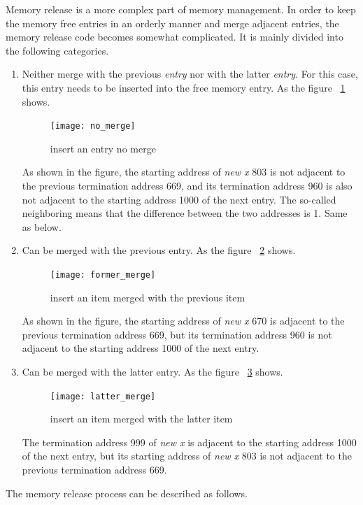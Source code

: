 \documentclass{swfcthesis}
\begin{document}
Memory release is a more complex part of memory management. In order to keep the memory
free entries in an orderly manner and merge adjacent entries, the memory release code
becomes somewhat complicated. It is mainly divided into the following categories.
\begin{enumerate}
\item Neither merge with the previous \emph{entry} nor with the latter \emph{entry}. For
  this case, this entry needs to be inserted into the free memory entry. As the figure
  ~\ref{fig:no-merge} shows.
  \begin{figure}[!ht]
    \centering
    \texttt{[image: no\_merge]}
    \caption{insert an entry no merge}
    \label{fig:no-merge}
  \end{figure}
  As shown in the figure, the starting address of \emph{new x} 803 is not adjacent to
  the previous termination address 669, and its termination address 960 is also not
  adjacent to the starting address 1000 of the next entry. The so-called neighboring means
  that the difference between the two addresses is 1. Same as below.

\item Can be merged with the previous entry. As the figure ~\ref{fig:former-merge} shows.
  \begin{figure}[!ht]
    \centering
    \texttt{[image: former\_merge]}
    \caption{insert an item merged with the previous item}
    \label{fig:former-merge}
  \end{figure}
  As shown in the figure, the starting address of \emph{new x} 670 is adjacent to the
  previous termination address 669, but its termination address 960 is not adjacent to the
  starting address 1000 of the next entry.


\item Can be merged with the latter entry. As the figure ~\ref{fig:latter-merge} shows.
  \begin{figure}[!ht]
    \centering
    \texttt{[image: latter\_merge]}
    \caption{insert an item merged with the latter item}
    \label{fig:latter-merge}
  \end{figure}
  The termination address 999 of \emph{new x} is adjacent to the starting address 1000
  of the next entry, but its starting address of \emph{new x} 803 is not adjacent to the
  previous termination address 669.
  
\end{enumerate}
The memory release process can be described as follows.
\end{document}
